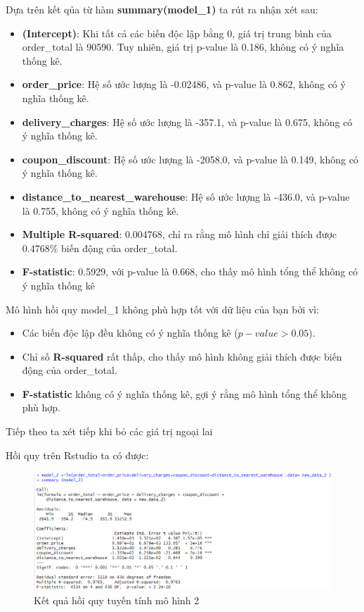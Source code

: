 Dựa trên kết qủa từ hàm \textbf{summary(model\_1)} ta rút ra nhận xét sau:
\begin{itemize}
\item \textbf{(Intercept)}: Khi tất cả các biến độc lập bằng 0, giá trị trung bình của order\_total là 90590. Tuy nhiên, giá trị p-value là 0.186, không có ý nghĩa thống kê.
\item \textbf{order\_price}: Hệ số ước lượng là -0.02486, và p-value là 0.862, không có ý nghĩa thống kê.
\item \textbf{delivery\_charges}: Hệ số ước lượng là -357.1, và p-value là 0.675, không có ý nghĩa thống kê.
\item \textbf{coupon\_discount}: Hệ số ước lượng là -2058.0, và p-value là 0.149, không có ý nghĩa thống kê.
\item \textbf{distance\_to\_nearest\_warehouse}: Hệ số ước lượng là -436.0, và p-value là 0.755, không có ý nghĩa thống kê.
\item\textbf{Multiple R-squared}: 0.004768, chỉ ra rằng mô hình chỉ giải thích được 0.4768\% biến động của order\_total.
\item\textbf{F-statistic}: 0.5929, với p-value là 0.668, cho thấy mô hình tổng thể không có ý nghĩa thống kê
\end{itemize}
Mô hình hồi quy model\_1 không phù hợp tốt với dữ liệu của bạn bởi vì:
\begin{itemize}
\item Các biến độc lập đều không có ý nghĩa thống kê ($p-value > 0.05$).
\item Chỉ số \textbf{R-squared} rất thấp, cho thấy mô hình không giải thích được biến động của order\_total.
\item\textbf{F-statistic} không có ý nghĩa thống kê, gợi ý rằng mô hình tổng thể không phù hợp.
\end{itemize}

Tiếp theo ta xét tiếp khi bỏ các giá trị ngoại lai

Hồi quy trên Rstudio ta có được:
\begin{figure}[!htp]
  \centering
  \includegraphics[width=0.7\linewidth]{graphics/5.5.3.png}
  \caption{Kết quả hồi quy tuyến tính mô hình 2 }
\end{figure} 

